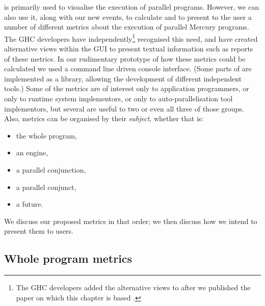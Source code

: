 \tscope is primarily used to visualise the execution of parallel programs.
However, we can also use it, along with our new events,
to calculate and to present to the user
a number of different metrics about the execution of parallel Mercury programs.
The GHC developers have independently\footnote{
    The GHC developers added the alternative views to \tscope after we
    published the paper on which this chapter is based
    \citep{bone:2011:tscope}.}
recognised this need,
and have created alternative views within the \tscope GUI to present textual
information such as reports of these metrics.
In our rudimentary prototype of how these metrics could be calculated we
used a command line driven console interface.
(Some parts of \tscope are implemented as a library,
allowing the development of different independent tools.)
Some of the metrics are of interest
only to application programmers,
or only to runtime system implementors,
or only to auto-parallelisation tool implementors,
but several are useful to two or even all three of those groups.
Also, metrics can be organised by their \emph{subject},
whether that is:
\begin{itemize}
    \item the whole program,

    \item an engine,

    \item a parallel conjunction,

    \item a parallel conjunct,

    \item a future.
\end{itemize}
We discuss our proposed metrics in that order;
we then discuss how we intend to present them to users.

%

\subsection{Whole program metrics}


